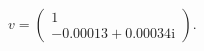 \documentclass[preview]{standalone}
\begin{document}
\begin{center}
\raggedright
                \(v = \begin{pmatrix}
                                1 \\
                                -0.00013 + 0.00034\mathrm{i}
                            \end{pmatrix}\).
\end{center}
\end{document}
